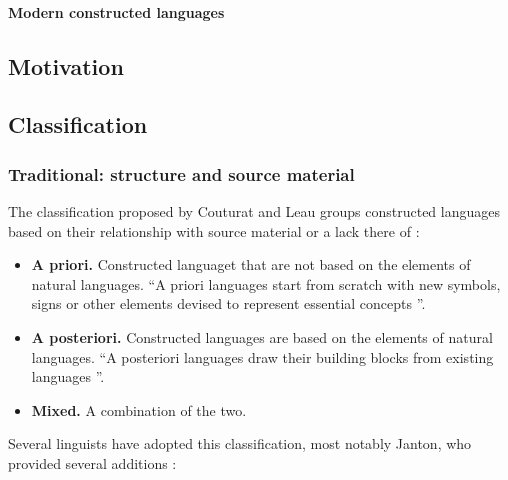 \documentclass[14pt, a4paper]{extreport}
\begin{document}
        \paragraph{Modern constructed languages}
    \subsection{Motivation}
    \subsection{Classification}
      \subsubsection{Traditional: structure and source material}
The classification proposed by Couturat and Leau groups constructed languages based on their relationship with source material or a lack there of \parencite{couturat}:

\begin{itemize}
  \item \textbf{A priori.} Constructed languaget that are not based on the elements of natural languages. ``A priori languages start from scratch with new symbols, signs or other elements devised to represent essential concepts \parencite{bianco}''.
  \item \textbf{A posteriori.} Constructed languages are based on the elements of natural languages. ``A posteriori languages draw their building blocks from existing languages  \parencite{bianco}''.
  \item \textbf{Mixed.} A combination of the two.
\end{itemize}

Several linguists have adopted this classification, most notably Janton, who provided several additions \parencite[5]{janton}:
\end{document}
